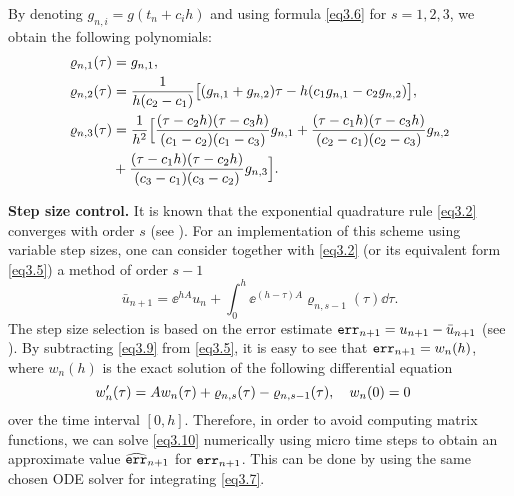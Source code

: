 \begin{examp}\label{ex3.1}\rm
By denoting $g_{n,i}=g(t_n +c_i h)$ and using formula \eqref{eq3.6} for $s=1,2,3$, we obtain the following polynomials:
\begin{subequations} \label{eq3.8}
\begin{align}
\varrho_{n,1}(\tau)&= g_{n,1}  ,\label{eq3.8a} \\
\varrho_{n,2}(\tau)&=\frac{1}{h(c_2-c_1)}\big[(g_{n,1}+g_{n,2})\tau- h(c_1 g_{n,1}-c_2 g_{n,2}) \big]   ,\label{eq3.8b} \\
\varrho_{n,3}(\tau)&=\frac{1}{h^2}\Big[ \frac{(\tau-c_2 h)(\tau-c_3 h)}{(c_1-c_2)(c_1-c_3)}g_{n,1}+\frac{(\tau-c_1 h)(\tau-c_3 h)}{(c_2-c_1)(c_2-c_3)}g_{n,2} \notag \\ 
&+\frac{(\tau-c_1 h)(\tau-c_2 h)}{(c_3-c_1)(c_3-c_2)}g_{n,3} \Big]   .\label{eq3.8c}
\end{align}
\end{subequations}  
\end{examp}
{\bf Step size control.} 
It is known that the exponential quadrature rule \eqref{eq3.2} converges with order $s$ 
(see \cite[Sect. 2.2]{HO10}). For an implementation of this scheme using variable step sizes, one can consider together with \eqref{eq3.2} (or its equivalent form \eqref{eq3.5}) a method of order $s-1$ 
\begin{equation} \label{eq3.9}
\bar{u}_{n+1} = \ee^{h A}u_n + \int_{0}^{h} \ee^{(h-\tau)A} \varrho_{n,s-1}(\tau) \dd \tau. 
\end{equation}
The step size selection is based on the error estimate ${\tt err}_{n+1}=u_{n+1}- \bar{u}_{n+1}$ (see \cite[Chapter IV.8]{HW96}).
By subtracting \eqref{eq3.9} from \eqref{eq3.5}, it is easy to see that ${\tt err}_{n+1}=w_n(h)$, where $w_n(h)$ is the exact solution of the following differential equation
\begin{equation} \label{eq3.10}
w'_n(\tau)=Aw_n(\tau) +  \varrho_{n,s}(\tau)-\varrho_{n,s-1}(\tau), \q  w_n(0)=0 \q 
\end{equation}  
over the time interval $[0, h]$. Therefore, in order to avoid computing matrix functions, we can solve \eqref{eq3.10} numerically using micro time steps to obtain an approximate value $\widehat{{\tt err}}_{n+1}$ for ${\tt err}_{n+1}$. This can be done by using the same chosen ODE solver for integrating \eqref{eq3.7}.

